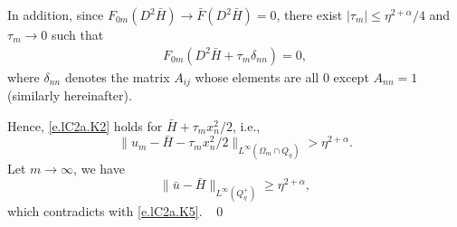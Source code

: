 \documentclass[preprint,12pt]{elsarticle}
\theoremstyle{definition}
\theoremstyle{remark}
\numberwithin{equation}{section}
\begin{document}
In addition, since $F_{0m}(D^2 \bar H)\rightarrow \bar F(D^2 \bar H)=0$, there exist $|\tau_m|\leq \eta^{2+\alpha}/4$ and $\tau_m\rightarrow 0$ such that
\begin{equation*}
  \begin{aligned}
F_{0m}(D^2 \bar H+\tau_m \delta_{nn})=0,
  \end{aligned}
\end{equation*}
where $\delta_{nn}$ denotes the matrix $A_{ij}$ whose elements are all $0$ except $A_{nn}=1$ (similarly hereinafter).

Hence, \cref{e.lC2a.K2} holds for $\bar H+\tau_m x^2_n/2$, i.e.,
\begin{equation*}
  \|u_m-\bar H-\tau_m x_n^2/2\|_{L^{\infty}(\Omega_m\cap Q_{\eta})}> \eta^{2+\alpha}.
\end{equation*}
Let $m\rightarrow \infty$, we have
\begin{equation*}
    \|\bar u-\bar H\|_{L^{\infty}(Q_{\eta}^+)}\geq \eta^{2+\alpha},
\end{equation*}
which contradicts with \cref{e.lC2a.K5}.  ~\qed~\\
\end{document}
